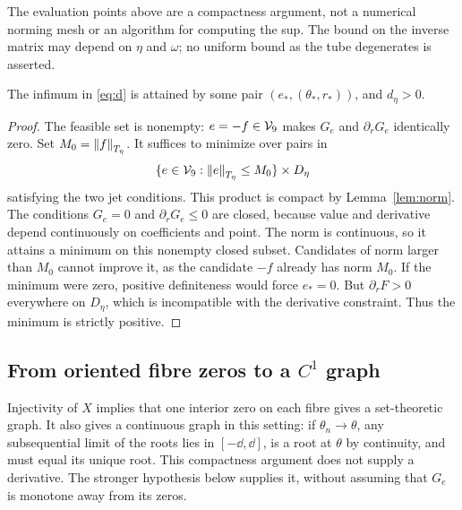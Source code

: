 \documentclass[11pt,a4paper]{article}
\begin{document}
The evaluation points above are a compactness argument, not a numerical
norming mesh or an algorithm for computing the sup. The bound on the
inverse matrix may depend on $\eta$ and $\omega$; no uniform bound as
the tube degenerates is asserted.

\begin{proposition}\label{prop:d}
The infimum in \eqref{eq:d} is attained by some pair
$(e_*,(\theta_*,r_*))$, and $d_\eta>0$.
\end{proposition}
\begin{proof}
The feasible set is nonempty: $e=-f\in\mathcal V_9$ makes $G_e$ and
$\partial_rG_e$ identically zero. Set $M_0=\left\lVert f\right\rVert_{T_\eta}$. It suffices to
minimize over pairs in
\[
 \{e\in\mathcal V_9:\left\lVert e\right\rVert_{T_\eta}\le M_0\}\times D_\eta
\]
satisfying the two jet conditions. This product is compact by
Lemma~\ref{lem:norm}. The conditions $G_e=0$ and
$\partial_rG_e\le0$ are closed, because value and derivative depend
continuously on coefficients and point. The norm is continuous, so it
attains a minimum on this nonempty closed subset. Candidates of norm
larger than $M_0$ cannot improve it, as the candidate $-f$ already has
norm $M_0$.
If the minimum were zero, positive definiteness would force $e_*=0$.
But $\partial_rF>0$ everywhere on $D_\eta$, which is incompatible
with the derivative constraint. Thus the minimum is strictly positive.
\end{proof}

\subsection{From oriented fibre zeros to a \texorpdfstring{$C^1$}{C1} graph}\label{sec:graph}

Injectivity of $X$ implies that one interior zero on each fibre gives a
set-theoretic graph. It also gives a continuous graph in this setting:
if $\theta_n\to\theta$, any subsequential limit of the roots lies in
$[-\dd,\dd]$, is a root at $\theta$ by continuity, and must equal
its unique root. This compactness argument does not supply a derivative.
The stronger hypothesis below supplies it, without assuming that $G_e$
is monotone away from its zeros.
\end{document}
